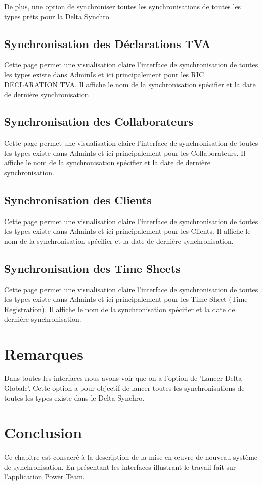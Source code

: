 De plus, une option de synchroniser toutes les synchronisations de toutes les types prêts pour la Delta Synchro.

\subsection{Synchronisation des Déclarations TVA}

Cette page permet une visualisation claire l'interface de synchronisation de toutes les types existe dans AdminIs et ici principalement pour les RIC DECLARATION TVA. Il affiche le nom de la synchronisation spécifier et la date de dernière synchronisation.

\subsection{Synchronisation des Collaborateurs}

Cette page permet une visualisation claire l'interface de synchronisation de toutes les types existe dans AdminIs et ici principalement pour les Collaborateurs. Il affiche le nom de la synchronisation spécifier et la date de dernière synchronisation.

\subsection{Synchronisation des Clients}

Cette page permet une visualisation claire l'interface de synchronisation de toutes les types existe dans AdminIs et ici principalement pour les Clients. Il affiche le nom de la synchronisation spécifier et la date de dernière synchronisation.

\subsection{Synchronisation des Time Sheets}

Cette page permet une visualisation claire l'interface de synchronisation de toutes les types existe dans AdminIs et ici principalement pour les Time Sheet (Time Registration). Il affiche le nom de la synchronisation spécifier et la date de dernière synchronisation.

\section{Remarques}

Dans toutes les interfaces nous avons voir que on a l'option de 'Lancer Delta Globale'. Cette option a pour objectif de lancer toutes les synchronisations de toutes les types existe dans le Delta Synchro.

\section{Conclusion}

Ce chapitre est consacré à la description de la mise en œuvre de nouveau système de synchronisation. En présentant les interfaces illustrant le travail fait sur l'application Power Team.
